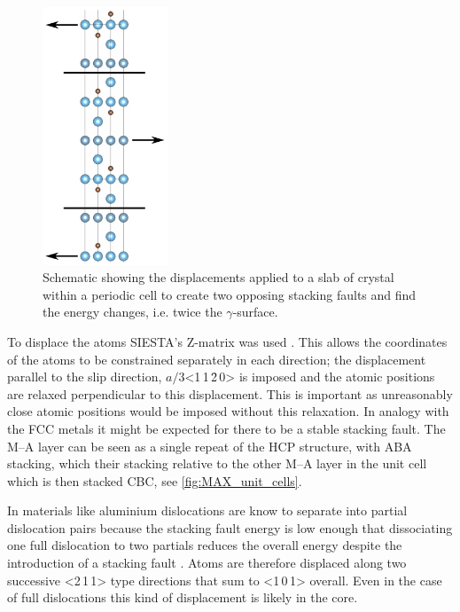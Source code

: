 \begin{figure}
\centering
\captionsetup{width=0.45\textwidth}
\includegraphics[width=0.3333\textwidth]{displacements_for_gamma_surface}
\caption[Schematic displacements during the simulation of the \texorpdfstring{$\gamma$}{gamma}-surface.]{Schematic showing the displacements applied to a slab of crystal within a periodic cell to create two opposing stacking faults and find the energy changes, i.e. twice the $\gamma$-surface. \label{fig:DFT_gamma_surface}}
\end{figure}

To displace the atoms SIESTA's Z-matrix was used \cite{SIESTA_manual}. This allows the coordinates of the atoms to be constrained separately in each direction; the displacement parallel to the slip direction, $a/3$<1\,1\,\={2}\,0> is imposed and the atomic positions are relaxed perpendicular to this displacement. This is important as unreasonably close atomic positions would be imposed without this relaxation. In analogy with the FCC metals it might be expected for there to be a stable stacking fault. The M--A layer can be seen as a single repeat of the HCP structure, with ABA stacking, which their stacking relative to the other M--A layer in the unit cell which is then stacked CBC, see \autoref{fig:MAX_unit_cells}. 

In materials like aluminium dislocations are know to separate into partial dislocation pairs because the stacking fault energy is low enough that dissociating one full dislocation to two partials reduces the overall energy despite the introduction of a stacking fault \cite{kelly2012ch9}. Atoms are therefore displaced along two successive <2\,1\,1> type directions that sum to <1\,0\,1> overall. Even in the case of full dislocations this kind of displacement is likely in the core.


